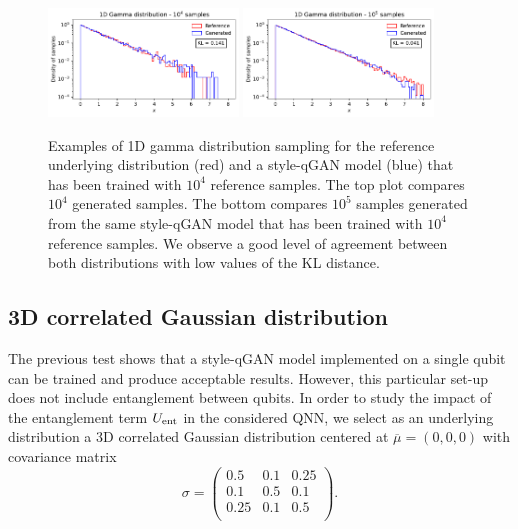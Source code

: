 \documentclass[twocolumn,preprintnumbers,superscriptaddress]{revtex4-2}
\begin{document}
\begin{figure}
  \includegraphics[width=0.45\textwidth]{plots/1Dgamma/1Dgamma_distribution_10k.pdf}
  \includegraphics[width=0.45\textwidth]{plots/1Dgamma/1Dgamma_distribution_100k.pdf}
  \caption{\label{fig:gamma} Examples of 1D gamma distribution sampling for the
  reference underlying distribution (red) and a style-qGAN model (blue) that has been
  trained with $10^4$ reference samples. The top plot compares $10^4$ generated samples. The bottom compares $10^5$ samples generated from the same style-qGAN model that has been trained with $10^4$ reference samples. We observe a good level of agreement between both distributions with low values of the KL distance.}
\end{figure}

\subsection{3D correlated Gaussian distribution}

The previous test shows that a style-qGAN model implemented on a single qubit can be
trained and produce acceptable results. However, this particular set-up does not
include entanglement between qubits. In order to study the impact of the
entanglement term $U_{\rm ent}$ in the considered QNN, we select as an
underlying distribution a 3D correlated Gaussian distribution centered at
$\overline{\mu}=(0,0,0)$ with covariance matrix
\begin{equation}
\label{eq:covmat}
  \sigma =
\begin{pmatrix}
  0.5 & 0.1 & 0.25\\
  0.1 & 0.5 & 0.1\\
  0.25 & 0.1 & 0.5\\
  \end{pmatrix}.
\end{equation}
\end{document}
